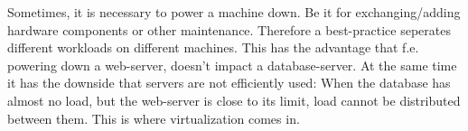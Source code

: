 \newline
Sometimes, it is necessary to power a machine down. Be it for exchanging/adding hardware components or other maintenance. Therefore a best-practice seperates different workloads on different machines. This has the advantage that f.e. powering down a web-server, doesn't impact a database-server. At the same time it has the downside that servers are not efficiently used: When the database has almost no load, but the web-server is close to its limit, load cannot be distributed between them. This is where virtualization comes in.






